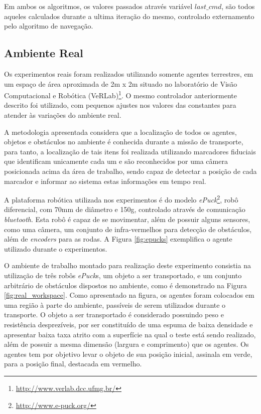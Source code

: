 Em ambos os algoritmos, os valores passados através variável $last\_cmd$, são todos aqueles calculados durante a ultima iteração do mesmo, controlado externamento pelo algoritmo de navegação.

\subsection{Ambiente Real} %
\label{sub:ambiente_real}

Os experimentos reais foram realizados utilizando somente agentes terrestres, em um espaço de área aproximada de 2m x 2m situado no laboratório de Visão Computacional e Robótica (VeRLab)\footnote{\url{http://www.verlab.dcc.ufmg.br/}}.
O mesmo controlador anteriormente descrito foi utilizado, com pequenos ajustes nos valores das constantes para atender às variações do ambiente real.

A metodologia apresentada considera que a localização de todos os agentes, objetos e obstáculos no ambiente é conhecida durante a missão de transporte, para tanto, a localização de tais itens foi realizada utilizando marcadores fiduciais que identificam unicamente cada um e são reconhecidos por uma câmera posicionada acima da área de trabalho, sendo capaz de detectar a posição de cada marcador e informar ao sistema estas informações em tempo real.

A plataforma robótica utilizada nos experimentos é do modelo \emph{ePuck}\footnote{\url{http://www.e-puck.org/}}, robô diferencial, com 70mm de diâmetro e 150g, controlado através de comunicação \emph{bluetooth}.
Esta robô é capaz de se movimentar, além de possuir alguns sensores, como uma câmera, um conjunto de infra-vermelhos para detecção de obstáculos, além de \emph{encoders} para as rodas.
A Figura \ref{fig:epucks} exemplifica o agente utilizado durante o experimentos.

O ambiente de trabalho montado para realização deste experimento consistia na utilização de três robôs \emph{ePuck}s, um objeto a ser transportado, e um conjunto arbitrário de obstáculos dispostos no ambiente, como é demonstrado na Figura \ref{fig:real_workspace}.
Como apresentado na figura, os agentes foram colocados em uma região à parte do ambiente, passíveis de serem utilizados durante o transporte.
O objeto a ser transportado é considerado possuindo peso e resistência desprezíveis, por ser constituído de uma espuma de baixa densidade e apresentar baixa taxa atrito com a superfície na qual o teste está sendo realizado, além de possuir a mesma dimensão (largura e comprimento) que os agentes.
Os agentes tem por objetivo levar o objeto de sua posição inicial, assinala em verde, para a posição final, destacada em vermelho.

